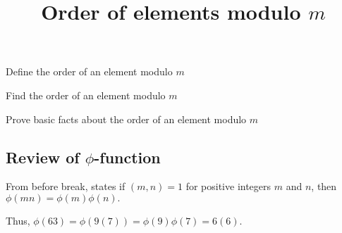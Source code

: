 \documentclass{ximera}
\title{Order of elements modulo $m$}
\begin{document}
\begin{abstract}
\end{abstract}
\maketitle


\begin{obj}
    \item Define the order of an element modulo $m$
    \item Find the order of an element modulo $m$
    \item Prove basic facts about the order of an element modulo $m$
\end{obj}


\subsection*{Review of $\phi$-function}

\begin{remark}
    From before break,  states if $(m,n)=1$ for positive integers $m$ and $n$, then $\phi(mn)=\phi(m)\phi(n).$ 

    Thus, $\phi(63)=\phi(9(7))=\phi(9)\phi(7)=6(6).$
\end{remark}
\end{document}
